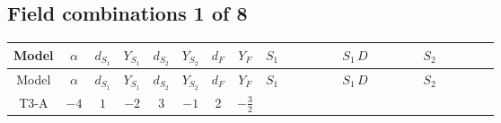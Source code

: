 \documentclass[8pt]{article}
\begin{document}
\begin{landscape}
\subsection*{Field combinations 1 of 8}
\begin{longtable}{@{}cccccccc >{\raggedright\arraybackslash}p{0.21\linewidth} >{\raggedright\arraybackslash}p{0.21\linewidth} >{\raggedright\arraybackslash}p{0.21\linewidth}@{}}
\toprule
Model & $\alpha$ & $d_{S_1}$ & $Y_{S_1}$ & $d_{S_2}$ & $Y_{S_2}$ & $d_F$ & $Y_F$ & $S_1$ & $S_1\,D$ & $S_2$ \\
\midrule
\endfirsthead
\toprule
Model & $\alpha$ & $d_{S_1}$ & $Y_{S_1}$ & $d_{S_2}$ & $Y_{S_2}$ & $d_F$ & $Y_F$ & $S_1$ & $S_1\,D$ & $S_2$ \\
\midrule
\endhead
T3-A & $-4$ & $1$ & $-2$ & $3$ & $-1$ & $2$ & $-\frac{3}{2}$ & \scriptsize\adjustbox{max width=\linewidth}{$\begin{gathered} -\frac{2 \hbar  \overline{y_{1,i_1,r_1}} \overline{y_{1,i_2,r_2}} S_1^2 y_{1,i_1,r_2} y_{1,i_2,r_1} \left(S_1{}^{\dagger }\right){}^2}{\epsilon } \\ -C_{S_1^\dagger S_1} S_1 S_1{}^{\dagger } \\ +C_{S_1^\dagger S_1} \hbar  \overline{y_{1,i_1,r_1}} S_1 y_{1,i_1,r_1} S_1{}^{\dagger }\end{gathered}$} & \scriptsize\adjustbox{max width=\linewidth}{$\begin{gathered} +D_{\mu _1}\left(S_1\right){}^{\dagger } D_{\mu _1}\left(S_1\right)\end{gathered}$} & \scriptsize\adjustbox{max width=\linewidth}{$\begin{gathered} +\frac{2 \hbar  \overline{y_{2,i_1,r_1}} \overline{y_{2,i_2,r_2}} S_{2,j_2}^2 y_{2,i_1,r_2} y_{2,i_2,r_1} \left(S_{2,j_1}{}^{\dagger }\right){}^2}{3 \epsilon } \\ -C_{S_2^\dagger S_2} S_{2,j_1} S_{2,j_1}{}^{\dagger } \\ +\frac{C_{S_2^\dagger S_2} \hbar  \overline{y_{2,i_1,r_1}} S_{2,j_1} y_{2,i_1,r_1} S_{2,j_1}{}^{\dagger }}{\sqrt{3}}\end{gathered}$} \\

\end{longtable}
\end{landscape}
\end{document}
